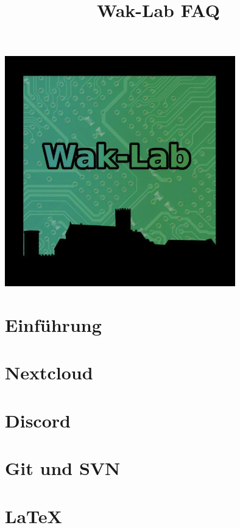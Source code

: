 

\title{Wak-Lab FAQ}


\maketitle

\maketitle
\begin{center}
\includegraphics[height=10cm]{pictures/LOGO.jpg}
\end{center}
\newpage
\section{Einführung}

\section{Nextcloud}

\section{Discord}

\section{Git und SVN}

\section{\LaTeX}




